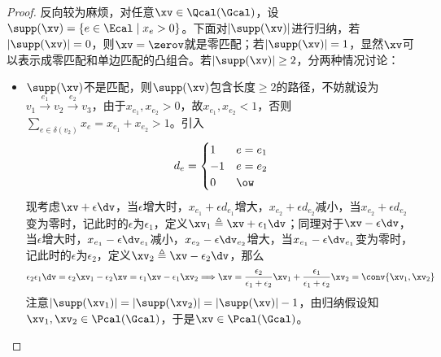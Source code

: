 \documentclass{ctexart}
\begin{document}
\begin{proof}
    反向较为麻烦，对任意$\xv \in \Qcal (\Gcal)$，设$\supp(\xv) = \{ e \in \Ecal \mid x_e > 0 \}$。下面对$|\supp(\xv)|$进行归纳，若$|\supp(\xv)| = 0$，则$\xv = \zerov$就是零匹配；若$|\supp(\xv)| = 1$，显然$\xv$可以表示成零匹配和单边匹配的凸组合。若$|\supp(\xv)| \ge 2$，分两种情况讨论：
    \begin{itemize}
        \item $\supp(\xv)$不是匹配，则$\supp(\xv)$包含长度$\ge 2$的路径，不妨就设为$v_1 \xrightarrow{e_1} v_2 \xrightarrow{e_2} v_3$，由于$x_{e_1}, x_{e_2} > 0$，故$x_{e_1}, x_{e_2} < 1$，否则$\sum_{e \in \delta(v_2)} x_e = x_{e_1} + x_{e_2} > 1$。引入
              \begin{align*}
                  d_e = \begin{cases}
                      1 & e = e_1 \\ -1 & e = e_2 \\ 0 & \ow
                  \end{cases}
              \end{align*}
              现考虑$\xv + \epsilon \dv$，当$\epsilon$增大时，$x_{e_1} + \epsilon d_{e_1}$增大，$x_{e_2} + \epsilon d_{e_2}$减小，当$x_{e_2} + \epsilon d_{e_2}$变为零时，记此时的$\epsilon$为$\epsilon_1$，定义$\xv_1 \triangleq \xv + \epsilon_1 \dv$；同理对于$\xv - \epsilon \dv$，当$\epsilon$增大时，$x_{e_1} - \epsilon \dv_{e_1}$减小，$x_{e_2} - \epsilon \dv_{e_2}$增大，当$x_{e_1} - \epsilon \dv_{e_1}$变为零时，记此时的$\epsilon$为$\epsilon_2$，定义$\xv_2 \triangleq \xv - \epsilon_2 \dv$，那么
              \begin{align*}
                  \epsilon_2 \epsilon_1 \dv = \epsilon_2 \xv_1 - \epsilon_2 \xv = \epsilon_1 \xv - \epsilon_1 \xv_2 \Longrightarrow \xv = \frac{\epsilon_2}{\epsilon_1 + \epsilon_2} \xv_1 + \frac{\epsilon_1}{\epsilon_1 + \epsilon_2} \xv_2 = \conv\{ \xv_1, \xv_2 \}
              \end{align*}
              注意$|\supp(\xv_1)| = |\supp(\xv_2)| = |\supp(\xv)| - 1$，由归纳假设知$\xv_1,\xv_2 \in \Pcal(\Gcal)$，于是$\xv \in \Pcal(\Gcal)$。


\end{itemize}
\end{proof}
\end{document}
